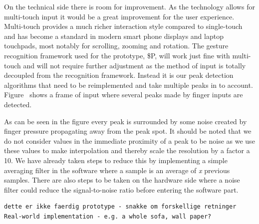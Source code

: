 On the technical side there is room for improvement.
As the technology allows for multi-touch input it would be a great improvement for the user experience.
Multi-touch provides a much richer interaction style  compared to single-touch and has become a standard in modern smart phone displays and laptop touchpads, most notably for scrolling, zooming and rotation.
The gesture recognition framework used for the prototype, \$P, will work just fine with multi-touch and will not require further adjustment as the method of input is totally decoupled from the recognition framework. 
Instead it is our peak detection algorithms that need to be reimplemented and take multiple peaks in to account.
Figure~ shows a frame of input where several peaks made by finger inputs are detected. 

As can be seen in the figure every peak is surrounded by some noise created by finger pressure propagating away from the peak spot.
It should be noted that we do not consider values in the immediate proximity of a peak to be noise as we use these values to make interpolation and thereby scale the resolution by a factor a 10.
We have already taken steps to reduce this by implementing a simple averaging filter in the software 
where a sample is an average of \emph{x} previous samples.
There are also steps to be taken on the hardware side where a noise filter could reduce the signal-to-noise ratio before entering the software part.


\begin{verbatim}
dette er ikke faerdig prototype - snakke om forskellige retninger
Real-world implementation - e.g. a whole sofa, wall paper?
\end{verbatim}

